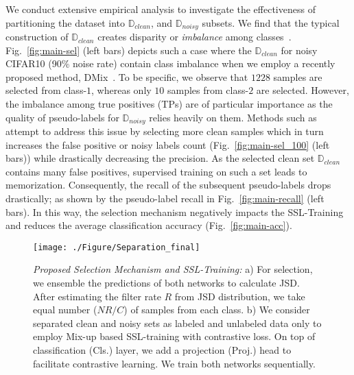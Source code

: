 \documentclass[10pt,twocolumn,letterpaper]{article}
\begin{document}
We conduct extensive empirical analysis to investigate the effectiveness of partitioning the dataset into $\mathbb{D}_{clean}$, and $\mathbb{D}_{noisy}$ subsets. We find that the typical construction of $\mathbb{D}_{clean}$ creates disparity or \emph{imbalance} among classes~\cite{li2020dividemix,han2018co,yao2021jo}. Fig.~\ref{fig:main-sel} (left bars) depicts such a case where the $\mathbb{D}_{clean}$ for noisy CIFAR10 (90\% noise rate) contain class imbalance when we employ a recently proposed method, DMix~\cite{li2020dividemix}. To be specific, we observe that $1228$ samples are selected from class-$1$, whereas only $10$ samples from class-$2$ are selected. However, the imbalance among true positives (TPs) are of particular importance as the quality of pseudo-labels for $\mathbb{D}_{noisy}$ relies heavily on them. Methods such as  \cite{li2020dividemix} attempt to address this issue by selecting more clean samples which in turn increases the false positive or noisy labels count (Fig.~\ref{fig:main-sel_100} (left bars)) while drastically decreasing the precision. As the selected clean set $\mathbb{D}_{clean}$ contains many false positives, supervised training on such a set leads to memorization. Consequently, the recall of the subsequent pseudo-labels drops drastically; as shown by the pseudo-label recall in Fig.~\ref{fig:main-recall} (left bars).
In this way, the selection mechanism negatively impacts the SSL-Training and reduces the average classification accuracy (Fig.~\ref{fig:main-acc}).

\begin{figure*}[htb]
\centering
\texttt{[image: ./Figure/Separation\_final]}
\vspace{-1mm}
\caption{{\it Proposed Selection Mechanism and SSL-Training:} a) For selection, we ensemble the predictions of both networks to calculate JSD. After estimating the filter rate $R$ from JSD distribution, we take equal number ($NR/C$) of samples from each class. b) We consider separated clean and noisy sets as labeled and unlabeled data only to employ Mix-up \cite{zhang2017mixup} based SSL-training with contrastive loss. On top of classification (Cls.) layer, we add a projection (Proj.) head to facilitate contrastive learning. We train both networks sequentially.}

\label{fig:sep}
\vspace{-1mm}
\end{figure*}
\end{document}
